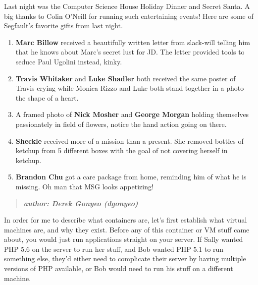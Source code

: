 \documentclass[9pt]{extarticle} %
\begin{document}
\begin{minipage}[t]{.66\linewidth} %
\vspace{-0.4cm}


\hypertarget{firstnews}{} 

Last night was the Computer Science House Holiday Dinner and Secret Santa. A big
thanks to Colin O’Neill for running such entertaining events! Here are some of 
Segfault’s favorite gifts from last night. 

\begin{enumerate}
\item \textbf{Marc Billow} received a beautifully written letter from slack-will
telling him that he knows about Marc's secret lust for JD. The letter provided 
tools to seduce Paul Ugolini instead, kinky. 

\item \textbf{Travis Whitaker} and \textbf{Luke Shadler} both received the same 
poster of Travis crying while Monica Rizzo and Luke both stand together in a photo
the shape of a heart. 

\item A framed photo of \textbf{Nick Mosher} and \textbf{George Morgan} holding
themselves passionately in field of flowers, notice the hand action going on there.

\item \textbf{Sheckle} received more of a mission than a present. She removed 
bottles of ketchup from 5 different boxes with the goal of not covering herself
in ketchup.  

\item \textbf{Brandon Chu} got a care package from home, reminding him of what he
is missing. Oh man that MSG looks appetizing!

\end{enumerate}


\hypertarget{secondnews}{}
\begin{quote}
\centering
\textbf{\textit{author: Derek Gonyeo (dgonyeo)}}
\end{quote}
	
In order for me to describe what containers are, let's first establish what
virtual machines are, and why they exist. Before any of this container or VM
stuff came about, you would just run applications straight on your server. 
If Sally wanted PHP 5.6 on the server to run her stuff, and Bob wanted PHP 5.1
to run something else, they'd either need to complicate their server by having multiple versions of PHP available, or Bob would need to run his stuff on a different machine.


\end{minipage}
\end{document}
